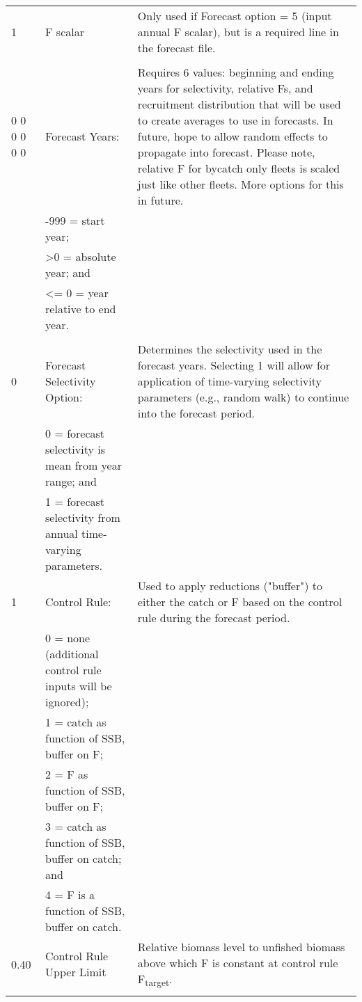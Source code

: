 \begin{landscape}
{\begin{longtable}{p{3.2cm} p{7cm} p{10.8cm}}
  \hline
  1 & F scalar & \multirow{1}{1cm}[-0.10cm]{\parbox{11cm}{Only used if Forecast option = 5 (input annual F scalar), but is a required line in the forecast file.}}\Tstrut\Bstrut\\
  & & \\
  
  \hline
  0 0 0 0 0 0 & Forecast Years: &  \multirow{1}{1cm}[-0.25cm]{\parbox{11cm}{Requires 6 values: beginning and ending years for selectivity, relative Fs, and recruitment distribution that will be used to create averages to use in forecasts.  In future, hope to allow random effects to propagate into forecast. Please note, relative F for bycatch only fleets is scaled just like other fleets.  More options for this in future.}}\Tstrut\\
    & -999 = start year; & \\
	& >0 = absolute year; and & \\
    & <= 0 = year relative to end year. & \\
    & & \Bstrut\\  

 0 & Forecast Selectivity Option: & \multirow{1}{1cm}[-0.25cm]{\parbox{11cm}{Determines the selectivity used in the forecast years. Selecting 1 will allow for application of time-varying selectivity parameters (e.g., random walk) to continue into the forecast period.}}\Tstrut\\
   & 0 = forecast selectivity is mean from year range; and & \\
   & 1 = forecast selectivity from annual time-varying parameters. & \Bstrut\\

 \hline   
 1 & Control Rule: & \multirow{1}{1cm}[-0.25cm]{\parbox{11cm}{Used to apply reductions ("buffer") to either the catch or F based on the control rule during the forecast period.}} \Tstrut\\
   & 0 = none (additional control rule inputs will be ignored); & \\
   & 1 = catch as function of SSB, buffer on F; & \\
   & 2 = F as function of SSB, buffer on F; & \\
   & 3 = catch as function of SSB, buffer on catch; and & \\
   & 4 = F is a function of SSB, buffer on catch. & \Bstrut\\
 \hline
 

 0.40 \Tstrut & Control Rule Upper Limit & \multirow{1}{1cm}[-0.25cm]{\parbox{11cm}{Relative biomass level to unfished biomass above which F is constant at control rule F\textsubscript{target}.}} \\
   &  & \Bstrut\\
 

\end{longtable}}
\end{landscape}
